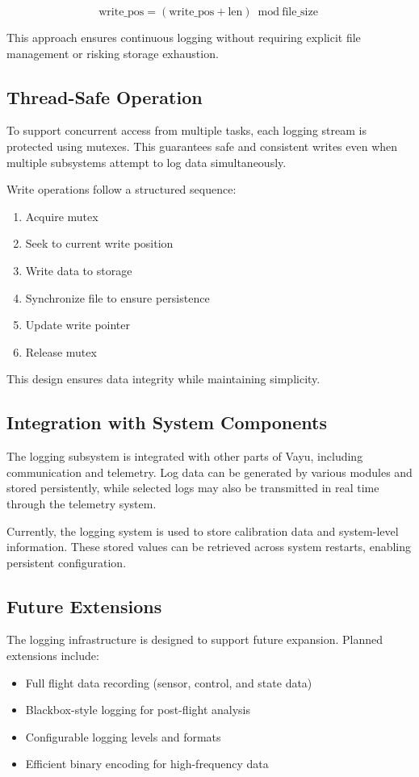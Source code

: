 \[
\text{write\_pos} = (\text{write\_pos} + \text{len}) \bmod \text{file\_size}
\]

This approach ensures continuous logging without requiring explicit file management or risking storage exhaustion.

\subsection{Thread-Safe Operation}

To support concurrent access from multiple tasks, each logging stream is protected using mutexes. This guarantees safe and consistent writes even when multiple subsystems attempt to log data simultaneously.

Write operations follow a structured sequence:
\begin{enumerate}
    \item Acquire mutex
    \item Seek to current write position
    \item Write data to storage
    \item Synchronize file to ensure persistence
    \item Update write pointer
    \item Release mutex
\end{enumerate}

This design ensures data integrity while maintaining simplicity.

\subsection{Integration with System Components}

The logging subsystem is integrated with other parts of Vayu, including communication and telemetry. Log data can be generated by various modules and stored persistently, while selected logs may also be transmitted in real time through the telemetry system.

Currently, the logging system is used to store calibration data and system-level information. These stored values can be retrieved across system restarts, enabling persistent configuration.

\subsection{Future Extensions}

The logging infrastructure is designed to support future expansion. Planned extensions include:
\begin{itemize}
    \item Full flight data recording (sensor, control, and state data)
    \item Blackbox-style logging for post-flight analysis
    \item Configurable logging levels and formats
    \item Efficient binary encoding for high-frequency data
\end{itemize}

